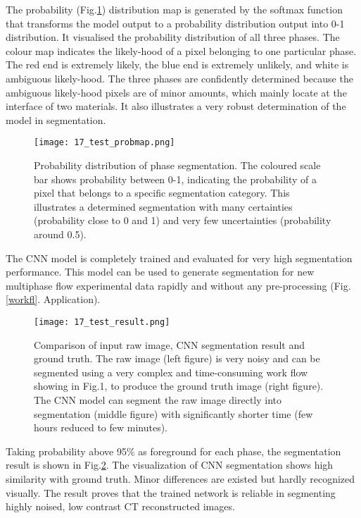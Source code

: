 \documentclass[draft,linenumbers]{agujournal2018}
\begin{document}
The probability (Fig.\ref{prob}) distribution map is generated by the softmax function that transforms the model output to a probability distribution output into 0-1 distribution. It visualised the probability distribution of all three phases. The colour map indicates the likely-hood of a pixel belonging to one particular phase. The red end is extremely likely, the blue end is extremely unlikely, and white is ambiguous likely-hood. The three phases are confidently determined because the ambiguous likely-hood pixels are of minor amounts, which mainly locate at the interface of two materials. It also illustrates a very robust determination of the model in segmentation. 
\begin{figure}[h]
 \centering
 \texttt{[image: 17\_test\_probmap.png]}
 \caption{Probability distribution of phase segmentation. The coloured scale bar shows probability between 0-1, indicating the probability of a pixel that belongs to a specific segmentation category. This illustrates a determined segmentation with many certainties (probability close to 0 and 1) and very few uncertainties (probability around 0.5).}
 \label{prob}
 \end{figure}
 
The CNN model is completely trained and evaluated for very high segmentation performance. This model can be used to generate segmentation for new multiphase flow experimental data rapidly and without any pre-processing (Fig.\ref{workfl}. Application).

\begin{figure}[h]
 \centering
 \texttt{[image: 17\_test\_result.png]}
 \caption{Comparison of input raw image, CNN segmentation result and ground truth. The raw image (left figure) is very noisy and can be segmented using a very complex and time-consuming work flow showing in Fig.1, to produce the ground truth image (right figure). The CNN model can segment the raw image directly into segmentation (middle figure) with significantly shorter time (few hours reduced to few minutes).}
 \label{result}
 \end{figure}

Taking probability above 95\% as foreground for each phase, the segmentation result is shown in Fig.\ref{result}. The visualization of CNN segmentation shows high similarity with ground truth. Minor differences are existed but hardly recognized visually. The result proves that the trained network is reliable in segmenting highly noised, low contrast CT reconstructed images.
\end{document}
